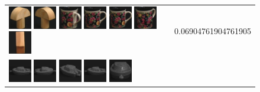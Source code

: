 \begin{figure}[tbp]
\begin{center}
\begin{tabular}{m{11cm} | m{3cm} |}
\includegraphics[width=1cm]{coil/beeld-3.eps}
\includegraphics[width=1cm]{coil/beeld-4.eps}
\includegraphics[width=1cm]{coil/beeld-64.eps}
\includegraphics[width=1cm]{coil/beeld-60.eps}
\includegraphics[width=1cm]{coil/beeld-60.eps}
\includegraphics[width=1cm]{coil/beeld-63.eps}
\includegraphics[width=1cm]{coil/beeld-44.eps}
& {\scriptsize 0.06904761904761905}
\\
\includegraphics[width=1cm]{coil/beeld-24.eps}
\includegraphics[width=1cm]{coil/beeld-27.eps}
\includegraphics[width=1cm]{coil/beeld-25.eps}
\includegraphics[width=1cm]{coil/beeld-24.eps}
\includegraphics[width=1cm]{coil/beeld-28.eps}

\end{tabular}
\end{center}
\end{figure}
